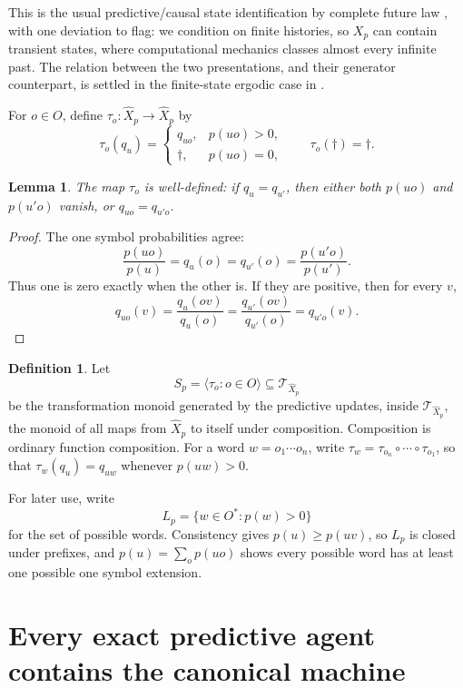 \documentclass[10pt]{article}
\newtheorem{lemma}[theorem]{Lemma}
\theoremstyle{definition}
\newtheorem{definition}[theorem]{Definition}
\theoremstyle{remark}
\newcommand{\Obs}{O}
\begin{document}
This is the usual predictive/causal state identification by complete future
law \cite{CrutchfieldYoung1989,ShaliziCrutchfield2001}, with one
deviation to flag: we condition on finite histories, so $X_p$ can
contain transient states, where computational mechanics classes almost
every infinite past.  The relation between the two presentations, and
their generator counterpart, is settled in the finite-state ergodic
case in \cite{TraversCrutchfield2025}.

For $o\in\Obs$, define $\tau_o:\widehat X_p\to\widehat X_p$ by
\[
  \tau_o(q_u)=
  \begin{cases}
    q_{uo},&p(uo)>0,\\
    \dagger,&p(uo)=0,
  \end{cases}
  \qquad
  \tau_o(\dagger)=\dagger.
\]

\begin{lemma}
The map $\tau_o$ is well-defined: if $q_u=q_{u'}$, then either both
$p(uo)$ and $p(u'o)$ vanish, or $q_{uo}=q_{u'o}$.
\end{lemma}

\begin{proof}
The one symbol probabilities agree:
\[
  \frac{p(uo)}{p(u)}=q_u(o)=q_{u'}(o)
  =\frac{p(u'o)}{p(u')}.
\]
Thus one is zero exactly when the other is.  If they are positive, then for every
$v$,
\[
  q_{uo}(v)=\frac{q_u(ov)}{q_u(o)}
  =\frac{q_{u'}(ov)}{q_{u'}(o)}
  =q_{u'o}(v).
\]
\end{proof}

\begin{definition}
Let
\[
  S_p=\langle\tau_o:o\in\Obs\rangle
  \subseteq\mathcal T_{\widehat X_p}
\]
be the transformation monoid generated by the predictive updates, inside
$\mathcal T_{\widehat X_p}$, the monoid of all maps from $\widehat X_p$ to
itself under composition.  Composition is
ordinary function composition.  For a word $w=o_1\cdots o_n$, write
$\tau_w=\tau_{o_n}\circ\cdots\circ\tau_{o_1}$, so that
$\tau_w(q_u)=q_{uw}$ whenever $p(uw)>0$.
\end{definition}

For later use, write
\[
  L_p=\{w\in\Obs^*:p(w)>0\}
\]
for the set of possible words.  Consistency gives
$p(u)\ge p(uv)$, so $L_p$ is closed under prefixes, and
$p(u)=\sum_o p(uo)$ shows every possible word has at least one possible
one symbol extension.

\section{Every exact predictive agent contains the canonical machine}
\label{sec:agent}
\end{document}
